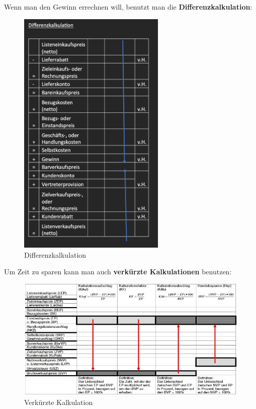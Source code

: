 \documentclass[10pt]{article}
\begin{document}
Wenn man den Gewinn errechnen will, benutzt man die \textbf{Differenzkalkulation}:
\begin{figure}[H]
\begin{center}
  \includegraphics[height=12cm]{kalkD.png}
  \end{center}
  \caption{Differenzkalkulation}
  \label{fig:Differenzkalkulation}
\end{figure}
Um Zeit zu sparen kann man auch \textbf{verk\"urzte Kalkulationen} benutzen:
\begin{figure}[H]
  \begin{center}
  \includegraphics[width=12cm]{kalkS.jpg}
  \end{center}
  \caption{Verkürzte Kalkulation}
  \label{fig:Verkürzte Kalkulation}
\end{figure}

\break
\end{document}
